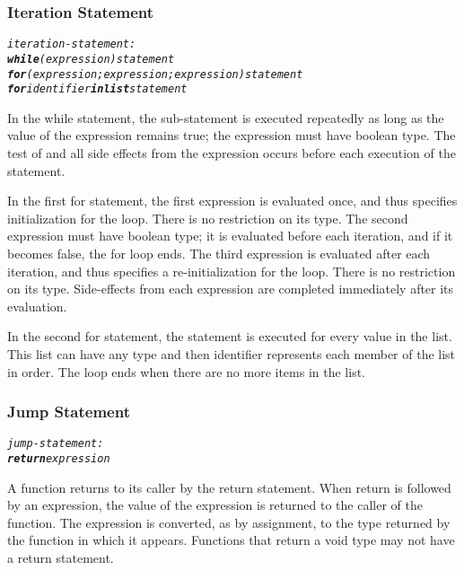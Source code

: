 \documentclass[12pt]{report}
\begin{document}
\subsubsection{Iteration Statement}
\begin{alltt}
         \textit{iteration-statement:}
              \textit{\textbf{while} (expression) statement}
              \textit{\textbf{for} (expression; expression; expression) statement}
              \textit{\textbf{for} identifier \textbf{in list} statement}
\end{alltt}
\begin{doublespace}
In the while statement, the sub-statement is executed repeatedly as long as the value of the expression remains true; the expression must have boolean type. The test of and all side effects from the expression occurs before each execution of the statement.

In the first for statement, the first expression is evaluated once, and thus specifies initialization for the loop. There is no restriction on its type. The second expression must have boolean type; it is evaluated before each iteration, and if it becomes false, the for loop ends. The third expression is evaluated after each iteration, and thus specifies a re-initialization for the loop. There is no restriction on its type. Side-effects from each expression are completed immediately after its evaluation.

In the second for statement, the statement is executed for every value in the list. This list can have any type and then identifier represents each member of the list in order. The loop ends when there are no more items in the list.
\end{doublespace}

\subsubsection{Jump Statement}
\begin{alltt}
         \textit{jump-statement:}
              \textit{\textbf{return} expression}
\end{alltt}
\begin{doublespace}
A function returns to its caller by the return statement. When return is followed by an expression, the value of the expression is returned to the caller of the function. The expression is converted, as by assignment, to the type returned by the function in which it appears. Functions that return a void type may not have a return statement.
\end{doublespace}
\end{document}
